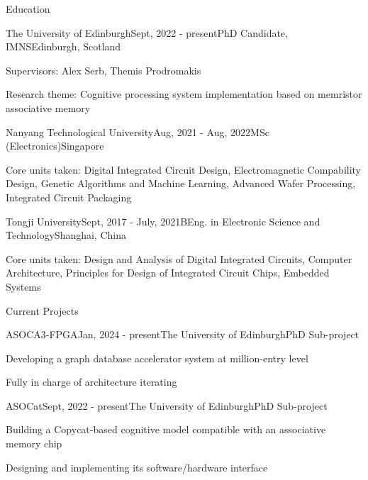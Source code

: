 \documentclass{resume} %
\begin{document}

\begin{rSection}{Education}

	\begin{rSubsection}{The University of Edinburgh}{Sept, 2022 - present}{PhD Candidate, IMNS}{Edinburgh, Scotland}
		\item Supervisors: Alex Serb, Themis Prodromakis
		\item Research theme: Cognitive processing system implementation based on memristor associative memory
	\end{rSubsection}
	
	\begin{rSubsection}{Nanyang Technological University}{Aug, 2021 - Aug, 2022}{MSc (Electronics)}{Singapore}
		\item Core units taken: Digital Integrated Circuit Design, Electromagnetic Compability Design, Genetic Algorithms and Machine Learning, Advanced Wafer Processing, Integrated Circuit Packaging
	\end{rSubsection}

	\begin{rSubsection}{Tongji University}{Sept, 2017 - July, 2021}{BEng. in Electronic Science and Technology}{Shanghai, China}
		\item Core units taken: Design and Analysis of Digital Integrated Circuits, Computer Architecture, Principles for Design of Integrated Circuit Chips, Embedded Systems
	\end{rSubsection}

\end{rSection}

\begin{rSection}{Current Projects}
	
	\begin{rSubsection}{ASOCA3-FPGA}{Jan, 2024 - present}{The University of Edinburgh}{PhD Sub-project}
		\item Developing a graph database accelerator system at million-entry level
		\item Fully in charge of architecture iterating
	\end{rSubsection}
	
	\begin{rSubsection}{ASOCat}{Sept, 2022 - present}{The University of Edinburgh}{PhD Sub-project}
		\item Building a Copycat-based cognitive model compatible with an associative memory chip
		\item Designing and implementing its software/hardware interface
	\end{rSubsection}

\end{rSection}
\end{document}
